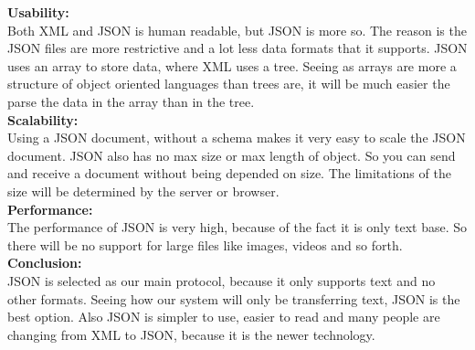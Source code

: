 \documentclass[12pt]{article}
\begin{document}
	\textbf{Usability:}
	\\\linebreak
	Both XML and JSON is human readable, but JSON is more so. The reason is the JSON files are more 			restrictive and a lot less data formats that it supports. JSON uses an array to store data, where XML 		uses a tree. Seeing as arrays are more a structure of object oriented languages than trees are, it 			will be much easier the parse the data in the array than in the tree. 
	\\\linebreak
	\textbf{Scalability:}
	\\\linebreak
	Using a JSON document, without a schema makes it very easy to scale the JSON document. JSON also has 		no max size or max length of object. So you can send and receive a document without being depended on 		size. The limitations of the size will be determined by the server or browser. 
	\\\linebreak
	\textbf{Performance:}
	\\\linebreak
	The performance of JSON is very high, because of the fact it is only text base. So there will be no 		support for large files like images, videos and so forth.
	\\\linebreak
	\textbf{Conclusion:}
	\\\linebreak
	JSON is selected as our main protocol, because it only supports text and no other formats. Seeing how 		our system will only be transferring text, JSON is the best option. Also JSON is simpler to use, 			easier to read and many people are changing from XML to JSON, because it is the newer technology.
	\\\linebreak
\end{document}
